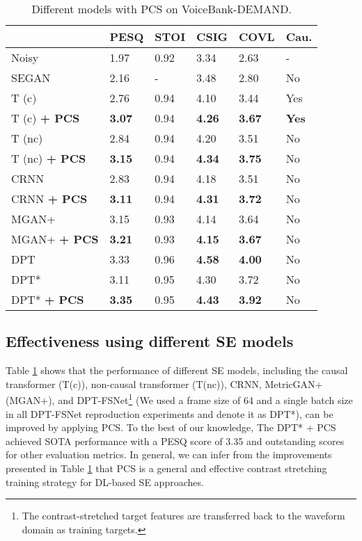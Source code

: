 \documentclass[a4paper]{article}
\begin{document}
\begin{table}[h]
\caption{Different models with PCS on VoiceBank-DEMAND.}
\label{table_2}
\centering
\begin{tabular}{l||lllll} 
\hline
                              & PESQ           & STOI  & CSIG    &  COVL  & Cau.  \\
\hline
Noisy             & 1.97 & 0.92 & 3.34 & 2.63 & - \\
\hline
SEGAN \cite{pascual2017segan} & 2.16 & - & 3.48 & 2.80 & No \\
T (c) \cite{fu2020boosting} & 2.76          & 0.94 & 4.10 & 3.44 & Yes     \\
T (c) \textbf{+ PCS}    & \textbf{3.07} & 0.94 & \textbf{4.26} & \textbf{3.67} & \textbf{Yes}     \\
T (nc) \cite{fu2020boosting} & 2.84          & 0.94 & 4.20 & 3.51 & No      \\
T (nc) \textbf{+ PCS}    & \textbf{3.15} & 0.94 & \textbf{4.34} & \textbf{3.75} & No      \\
CRNN \cite{zhao2018convolutional} & 2.83          & 0.94 & 4.18 & 3.51 & No      \\
CRNN \textbf{+ PCS}     & \textbf{3.11} & 0.94 & \textbf{4.31} & \textbf{3.72} & No      \\
MGAN+ \cite{fu2021metricgan+}    & 3.15 & 0.93 & 4.14  & 3.64  & No      \\ 
MGAN+ \textbf{+ PCS}    & \textbf{3.21} & 0.93 & \textbf{4.15} & \textbf{3.67} & No      \\
DPT \cite{dang2021dpt}  & 3.33 & 0.96 & \textbf{4.58} & \textbf{4.00} & No      \\
DPT*                    & {3.11} & 0.95 & 4.30 & 3.72 & No      \\
DPT* \textbf{+ PCS}     & \textbf{3.35} & 0.95 & \textbf{4.43} & \textbf{3.92} & No      \\
\hline
\end{tabular}
\end{table}


\subsection {Effectiveness using different SE models}

Table \ref{table_2} shows that the performance of different SE models, including the causal transformer (T(c)), non-causal transformer (T(nc)), CRNN, MetricGAN+ (MGAN+), and DPT-FSNet\footnote{The contrast-stretched target features are transferred back to the waveform domain as training targets.} (We used a frame size of 64 and a single batch size in all DPT-FSNet reproduction experiments and denote it as DPT*), can be improved by applying PCS. To the best of our knowledge, The DPT* + PCS achieved SOTA performance with a PESQ score of 3.35 and outstanding scores for other evaluation metrics. 
In general, we can infer from the improvements presented in Table \ref{table_2} that PCS is a general and effective contrast stretching training strategy for DL-based SE approaches.
\end{document}
